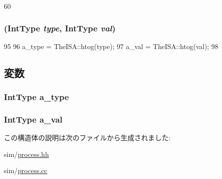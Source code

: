 \begin{DoxyCode}
60     {}
\end{DoxyCode}
\hypertarget{structAuxVector_ad823c76cc9104660814ba71a8ce43db1}{
\subsubsection[{AuxVector}]{ (IntType {\em type}, \/  IntType {\em val})}}
\label{structAuxVector_ad823c76cc9104660814ba71a8ce43db1}



\begin{DoxyCode}
95 {
96     a_type = TheISA::htog(type);
97     a_val = TheISA::htog(val);
98 }
\end{DoxyCode}


\subsection{変数}
\hypertarget{structAuxVector_a4b056bc811e2d0991534ddd1c5f34331}{
\subsubsection[{a\_\-type}]{\setlength{\rightskip}{0pt plus 5cm}IntType {\bf a\_\-type}}}
\label{structAuxVector_a4b056bc811e2d0991534ddd1c5f34331}
\hypertarget{structAuxVector_a107121929143b17dedbc4fb74a7af245}{
\subsubsection[{a\_\-val}]{\setlength{\rightskip}{0pt plus 5cm}IntType {\bf a\_\-val}}}
\label{structAuxVector_a107121929143b17dedbc4fb74a7af245}


この構造体の説明は次のファイルから生成されました:\begin{DoxyCompactItemize}
\item 
sim/\hyperlink{sim_2process_8hh}{process.hh}\item 
sim/\hyperlink{sim_2process_8cc}{process.cc}\end{DoxyCompactItemize}

